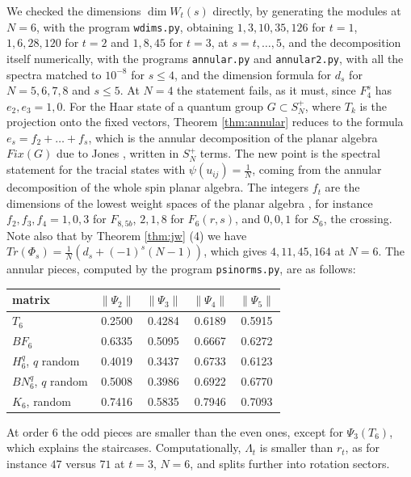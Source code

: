 \documentclass[11pt]{amsart}
\begin{document}
We checked the dimensions $\dim W_t(s)$ directly, by generating the modules at $N=6$, with the program \texttt{wdims.py}, obtaining $1,3,10,35,126$ for $t=1$, $1,6,28,120$ for $t=2$ and $1,8,45$ for $t=3$, at $s=t,\ldots,5$, and the decomposition itself numerically, with the programs \texttt{annular.py} and \texttt{annular2.py}, with all the spectra matched to $10^{-8}$ for $s\leq4$, and the dimension formula for $d_s$ for $N=5,6,7,8$ and $s\leq5$. At $N=4$ the statement fails, as it must, since $F_4^s$ has $e_2,e_3=1,0$. For the Haar state of a quantum group $G\subset S_N^+$, where $T_k$ is the projection onto the fixed vectors, Theorem \ref{thm:annular} reduces to the formula $e_s=f_2+\ldots+f_s$, which is the annular decomposition of the planar algebra $Fix(G)$ due to Jones \cite{jo2}, written in $S_N^+$ terms. The new point is the spectral statement for the tracial states with $\psi(u_{ij})=\frac{1}{N}$, coming from the annular decomposition of the whole spin planar algebra. The integers $f_t$ are the dimensions of the lowest weight spaces of the planar algebra \cite{jo2}, for instance $f_2,f_3,f_4=1,0,3$ for $F_{8,5b}$, $2,1,8$ for $F_6(r,s)$, and $0,0,1$ for $S_6$, the crossing. Note also that by Theorem \ref{thm:jw} (4) we have $Tr(\Phi_s)=\frac{1}{N}(d_s+(-1)^s(N-1))$, which gives $4,11,45,164$ at $N=6$. The annular pieces, computed by the program \texttt{psinorms.py}, are as follows:

\medskip

\begin{center}
\begin{tabular}{lcccc}
\toprule
matrix & $\|\Psi_2\|$ & $\|\Psi_3\|$ & $\|\Psi_4\|$ & $\|\Psi_5\|$\\
\midrule
$T_6$ & 0.2500 & 0.4284 & 0.6189 & 0.5915\\
$BF_6$ & 0.6335 & 0.5095 & 0.6667 & 0.6272\\
$H_6^q$, $q$ random & 0.4019 & 0.3437 & 0.6733 & 0.6123\\
$BN_6^q$, $q$ random & 0.5008 & 0.3986 & 0.6922 & 0.6770\\
$K_6$, random & 0.7416 & 0.5835 & 0.7946 & 0.7093\\
\bottomrule
\end{tabular}
\end{center}

\medskip

\noindent At order 6 the odd pieces are smaller than the even ones, except for $\Psi_3(T_6)$, which explains the staircases. Computationally, $\Lambda_t$ is smaller than $r_t$, as for instance $47$ versus $71$ at $t=3$, $N=6$, and splits further into rotation sectors. 
\end{document}
